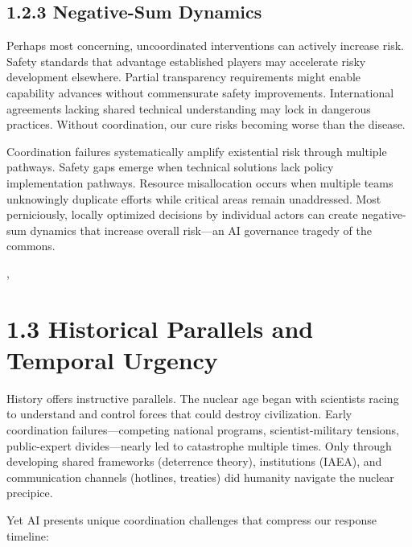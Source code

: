 \documentclass[
  11pt,
  letterpaper,
]{book}
\begin{document}
\subsection*{1.2.3 Negative-Sum Dynamics}\label{sec-negative-sum}

Perhaps most concerning, uncoordinated interventions can actively
increase risk. Safety standards that advantage established players may
accelerate risky development elsewhere. Partial transparency
requirements might enable capability advances without commensurate
safety improvements. International agreements lacking shared technical
understanding may lock in dangerous practices. Without coordination, our
cure risks becoming worse than the disease.

Coordination failures systematically amplify existential risk through
multiple pathways. Safety gaps emerge when technical solutions lack
policy implementation pathways. Resource misallocation occurs when
multiple teams unknowingly duplicate efforts while critical areas remain
unaddressed. Most perniciously, locally optimized decisions by
individual actors can create negative-sum dynamics that increase overall
risk---an AI governance tragedy of the commons.

\textcite{armstrong2016}

\textcite{samuel2023}, \textcite{hunt2025}

\section*{1.3 Historical Parallels and Temporal
Urgency}\label{sec-historical-urgency}


History offers instructive parallels. The nuclear age began with
scientists racing to understand and control forces that could destroy
civilization. Early coordination failures---competing national programs,
scientist-military tensions, public-expert divides---nearly led to
catastrophe multiple times. Only through developing shared frameworks
(deterrence theory), institutions (IAEA), and communication channels
(hotlines, treaties) did humanity navigate the nuclear precipice.

\textcite{schelling1960}

\textcite{rehman2025}

Yet AI presents unique coordination challenges that compress our
response timeline:
\end{document}
